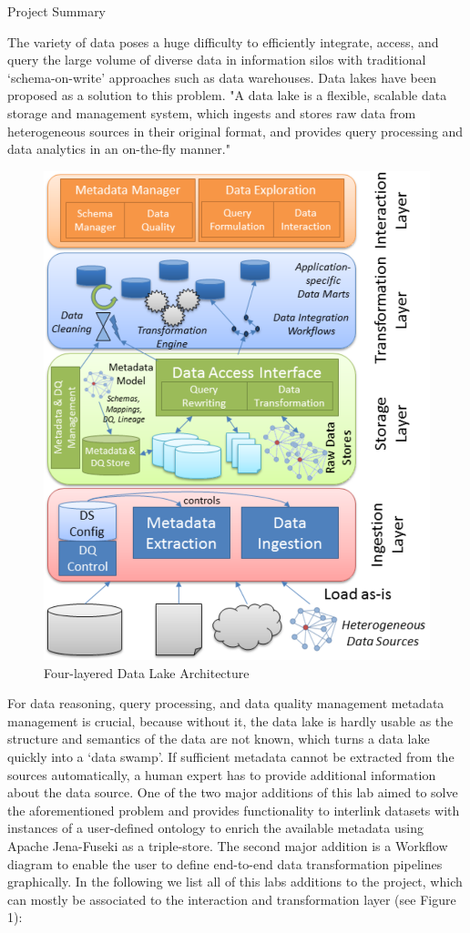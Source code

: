 \documentclass[12pt]{beamer}
\begin{document}
\begin{textblock}{0.5}
\begin{block}{Project Summary}
			\item The variety of data poses a huge difficulty to efficiently integrate, access, and query the large volume of diverse data in information silos with traditional ‘schema-on-write’ approaches such as data warehouses. Data lakes have been proposed as a solution to this problem. "A data lake is a flexible, scalable data storage and management system, which ingests and stores raw data from heterogeneous sources in their original format, and provides query processing and data analytics in an on-the-fly manner." \cite{1}
			\begin{figure}[H]
				\includegraphics[width=0.8\linewidth]{data_lake_architecture.PNG}
				\caption{Four-layered Data Lake Architecture \cite{2}} \label{Figure 1}
			\end{figure}
			For data reasoning, query processing, and data quality management metadata management is crucial, because without it, the data lake is hardly usable as the structure and semantics of the data are not known, which turns a data lake quickly into a ‘data swamp’. If sufficient metadata cannot be extracted from the sources automatically, a human expert has to provide additional information about the data source. \cite{1} One of the two major additions of this lab aimed to solve the aforementioned problem and provides functionality to interlink datasets with instances of a user-defined ontology to enrich the available metadata using Apache Jena-Fuseki as a triple-store. The second major addition is a Workflow diagram to enable the user to define end-to-end data transformation pipelines graphically. In the following we list all of this labs additions to the project, which can mostly be associated  to the interaction and transformation layer (see Figure 1): \\
		\end{block}
		

\end{textblock}
\end{document}
